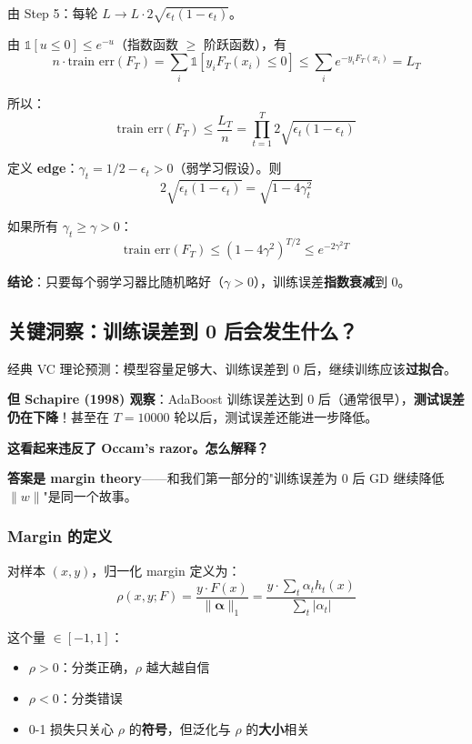 \documentclass[12pt, a4paper]{ctexart}
\begin{document}
\begin{blackboard}

由 Step 5：每轮 $L \to L \cdot 2\sqrt{\epsilon_t(1-\epsilon_t)}$。

由 $\mathbb{1}[u \leq 0] \leq e^{-u}$（指数函数 $\geq$ 阶跃函数），有
\[
n \cdot \text{train err}(F_T) = \sum_i \mathbb{1}[y_i F_T(x_i) \leq 0] \leq \sum_i e^{-y_i F_T(x_i)} = L_T
\]

所以：
\[
\text{train err}(F_T) \leq \frac{L_T}{n} = \prod_{t=1}^{T} 2\sqrt{\epsilon_t(1-\epsilon_t)}
\]

定义 \textbf{edge}：$\gamma_t = 1/2 - \epsilon_t > 0$（弱学习假设）。则
\[
2\sqrt{\epsilon_t(1-\epsilon_t)} = \sqrt{1 - 4\gamma_t^2}
\]

如果所有 $\gamma_t \geq \gamma > 0$：
\[
\boxed{\text{train err}(F_T) \leq (1 - 4\gamma^2)^{T/2} \leq e^{-2\gamma^2 T}}
\]

\textbf{结论}：只要每个弱学习器比随机略好（$\gamma > 0$），训练误差\textbf{指数衰减}到 0。

\end{blackboard}

\subsection{关键洞察：训练误差到 0 后会发生什么？}

\begin{insight}[反直觉的实验观察]
经典 VC 理论预测：模型容量足够大、训练误差到 0 后，继续训练应该\textbf{过拟合}。

\textbf{但 Schapire (1998) 观察}：AdaBoost 训练误差达到 0 后（通常很早），\textbf{测试误差仍在下降}！甚至在 $T = 10000$ 轮以后，测试误差还能进一步降低。

\textbf{这看起来违反了 Occam's razor。怎么解释？}
\end{insight}

\textbf{答案是 margin theory}——和我们第一部分的"训练误差为 0 后 GD 继续降低 $\|w\|$"是同一个故事。

\subsubsection{Margin 的定义}

对样本 $(x, y)$，归一化 margin 定义为：
\[
\rho(x, y; F) = \frac{y \cdot F(x)}{\|\bm{\alpha}\|_1} = \frac{y \cdot \sum_t \alpha_t h_t(x)}{\sum_t |\alpha_t|}
\]

这个量 $\in [-1, 1]$：
\begin{itemize}
\item $\rho > 0$：分类正确，$\rho$ 越大越自信
\item $\rho < 0$：分类错误
\item 0-1 损失只关心 $\rho$ 的\textbf{符号}，但泛化与 $\rho$ 的\textbf{大小}相关
\end{itemize}
\end{document}
